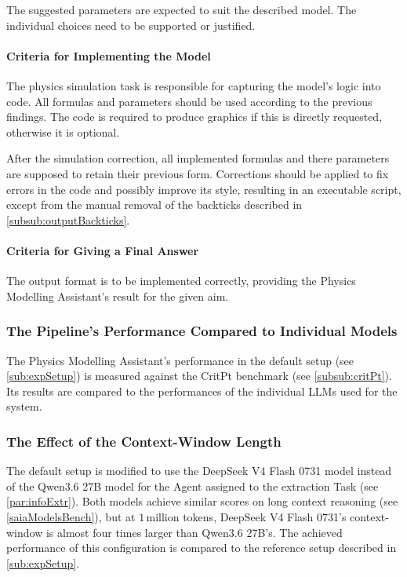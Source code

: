 \documentclass[
	fontsize = 11pt,
	paper = a4,
	draft = false,
	twoside = true,
	titlepage = false
]{scrartcl}
\numberwithin{equation}{subsection}
\begin{document}
	The suggested parameters are expected to suit the described model. The individual choices need to be supported or justified.
	
	\paragraph{Criteria for Implementing the Model} \label{criteria:implement}
	The physics simulation task is responsible for capturing the model's logic into code. All formulas and parameters should be used according to the previous findings. The code is required to produce graphics if this is directly requested, otherwise it is optional.
	
	After the simulation correction, all implemented formulas and there parameters are supposed to retain their previous form. Corrections should be applied to fix errors in the code and possibly improve its style, resulting in an executable script, except from the manual removal of the backticks described in \autoref{subsub:outputBackticks}.
	
	\paragraph{Criteria for Giving a Final Answer} \label{criteria:answer}
	The output format is to be implemented correctly, providing the Physics Modelling Assistant's result for the given aim.
	
	\subsubsection{The Pipeline's Performance Compared to Individual Models} \label{subsub:Reference}
	The Physics Modelling Assistant's performance in the default setup (see \autoref{sub:expSetup}) is measured against the CritPt benchmark (see \autoref{subsub:critPt}). Its results are compared to the performances of the individual \gls{LLM}s used for the system.
		
	\subsubsection{The Effect of the Context-Window Length} \label{subsub:1Deep}
	The default setup is modified to use the DeepSeek V4 Flash 0731 model instead of the Qwen3.6 27B model for the \gls{Agent} assigned to the extraction Task (see \autoref{par:infoExtr}). Both models achieve similar scores on long context reasoning (see \autoref{saiaModelsBench}), but at $1\,$million \glspl{token}, DeepSeek V4 Flash 0731's \gls{context-window} is almost four times larger than Qwen3.6 27B's. The achieved performance of this configuration is compared to the reference setup described in \autoref{sub:expSetup}.
	
\end{document}
